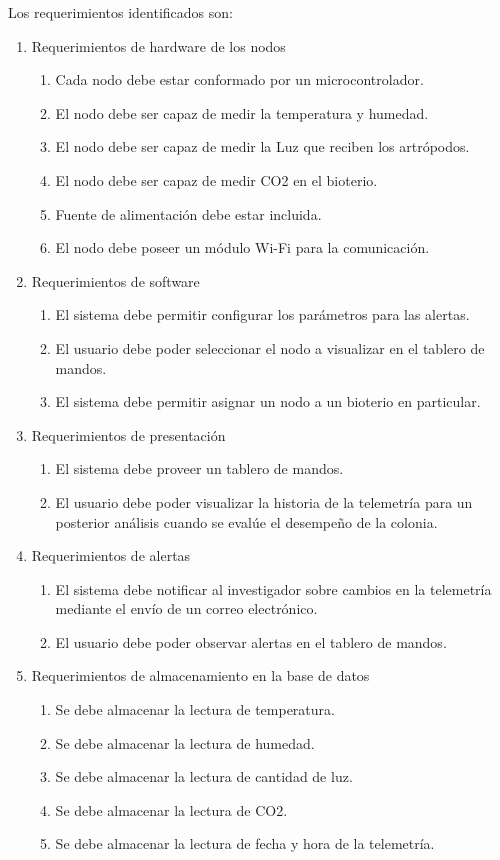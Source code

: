 \documentclass[
11pt, %
]{charter}
\begin{document}
Los requerimientos identificados son:
\begin{enumerate}
	\item Requerimientos de hardware de los nodos
		\begin{enumerate}
			\item Cada nodo debe estar conformado por un microcontrolador.
			\item El nodo debe ser capaz de medir la temperatura y humedad.
			\item El nodo debe ser capaz de medir la Luz que reciben los artrópodos.
			\item El nodo debe ser capaz de medir CO2 en el bioterio.
			\item Fuente de alimentación debe estar incluida.
			\item El nodo debe poseer un módulo Wi-Fi para la comunicación.
		\end{enumerate}
	\item Requerimientos de software
		\begin{enumerate}
			\item El sistema debe permitir configurar los parámetros para las alertas.
			\item El usuario debe poder seleccionar el nodo a visualizar en el tablero de mandos.
			\item El sistema debe permitir asignar un nodo a un bioterio en particular.
		\end{enumerate}
	\item Requerimientos de presentación
		\begin{enumerate}
			\item El sistema debe proveer un tablero de mandos.
			\item El usuario debe poder visualizar la historia de la telemetría para un posterior análisis cuando se evalúe el desempeño de la colonia.
		\end{enumerate}
	\item Requerimientos de alertas
		\begin{enumerate}
			\item El sistema debe notificar al investigador sobre cambios en la telemetría mediante el envío de un correo electrónico.
			\item El usuario debe poder observar alertas en el tablero de mandos.
		\end{enumerate}
	\item Requerimientos de almacenamiento en la base de datos
		\begin{enumerate}
			\item Se debe almacenar la lectura de temperatura.
			\item Se debe almacenar la lectura de humedad.
			\item Se debe almacenar la lectura de cantidad de luz.
			\item Se debe almacenar la lectura de CO2.
			\item Se debe almacenar la lectura de fecha y hora de la telemetría.
		\end{enumerate}
\end{enumerate}
\end{document}
